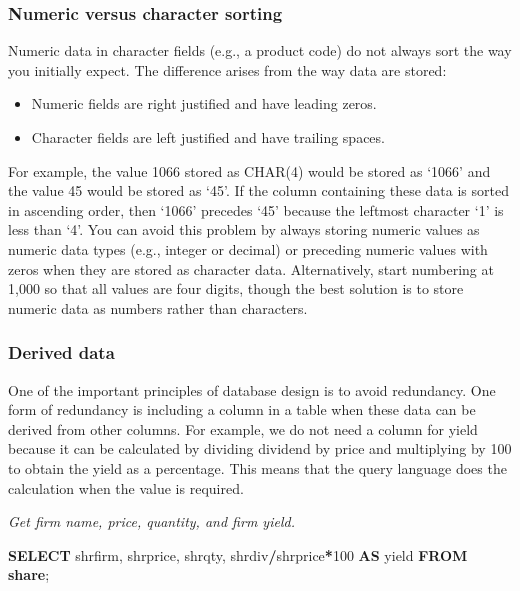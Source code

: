 \documentclass[
]{article}
\newenvironment{Shaded}{\begin{snugshade}}{\end{snugshade}}
\newcommand{\DecValTok}[1]{\textcolor[rgb]{0.00,0.00,0.81}{#1}}
\newcommand{\KeywordTok}[1]{\textcolor[rgb]{0.13,0.29,0.53}{\textbf{#1}}}
\newcommand{\NormalTok}[1]{#1}
\newcommand{\OperatorTok}[1]{\textcolor[rgb]{0.81,0.36,0.00}{\textbf{#1}}}
\begin{document}
\hypertarget{numeric-versus-character-sorting}{%
\subsubsection{Numeric versus character
sorting}\label{numeric-versus-character-sorting}}

Numeric data in character fields (e.g., a product code) do not always
sort the way you initially expect. The difference arises from the way
data are stored:

\begin{itemize}
\item
  Numeric fields are right justified and have leading zeros.
\item
  Character fields are left justified and have trailing spaces.
\end{itemize}

For example, the value 1066 stored as CHAR(4) would be stored as `1066'
and the value 45 would be stored as `45'. If the column containing these
data is sorted in ascending order, then `1066' precedes `45' because the
leftmost character `1' is less than `4'. You can avoid this problem by
always storing numeric values as numeric data types (e.g., integer or
decimal) or preceding numeric values with zeros when they are stored as
character data. Alternatively, start numbering at 1,000 so that all
values are four digits, though the best solution is to store numeric
data as numbers rather than characters.

\hypertarget{derived-data}{%
\subsubsection{Derived data}\label{derived-data}}

One of the important principles of database design is to avoid
redundancy. One form of redundancy is including a column in a table when
these data can be derived from other columns. For example, we do not
need a column for yield because it can be calculated by dividing
dividend by price and multiplying by 100 to obtain the yield as a
percentage. This means that the query language does the calculation when
the value is required.

\emph{Get firm name, price, quantity, and firm yield.}

\begin{Shaded}
\begin{Highlighting}[]
\KeywordTok{SELECT}\NormalTok{ shrfirm, shrprice, shrqty, shrdiv}\OperatorTok{/}\NormalTok{shrprice}\OperatorTok{*}\DecValTok{100} \KeywordTok{AS}\NormalTok{ yield }\KeywordTok{FROM} \KeywordTok{share}\NormalTok{;}
\end{Highlighting}
\end{Shaded}
\end{document}
